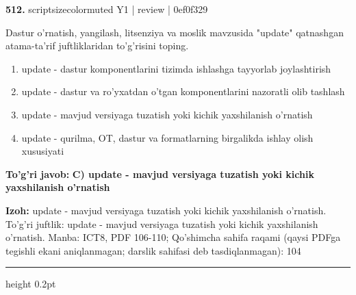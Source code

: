 \documentclass[10pt,a4paper]{article}
\begin{document}
{\bfseries\sffamily\color{ink} 512.} {scriptsizecolor{muted} Y1 | review | 0ef0f329}
\par
Dastur o'rnatish, yangilash, litsenziya va moslik mavzusida "update" qatnashgan atama-ta'rif juftliklaridan to'g'risini toping.
\begin{enumerate}[label=\Alph*),leftmargin=9mm]
\item update - dastur komponentlarini tizimda ishlashga tayyorlab joylashtirish
\item update - dastur va ro'yxatdan o'tgan komponentlarini nazoratli olib tashlash
\item update - mavjud versiyaga tuzatish yoki kichik yaxshilanish o'rnatish
\item update - qurilma, OT, dastur va formatlarning birgalikda ishlay olish xususiyati
\end{enumerate}
\begin{tcolorbox}[enhanced,breakable,colback=teal!4,colframe=teal!60!black,boxrule=0.45pt,arc=1.2mm,left=2.7mm,right=2.7mm,top=1.8mm,bottom=1.8mm,before skip=2mm,after skip=2mm]
{\bfseries\sffamily\color{teal}To'g'ri javob:} \textbf{C) update - mavjud versiyaga tuzatish yoki kichik yaxshilanish o'rnatish}
\par\smallskip
{\bfseries Izoh:} update - mavjud versiyaga tuzatish yoki kichik yaxshilanish o'rnatish. To'g'ri juftlik: update - mavjud versiyaga tuzatish yoki kichik yaxshilanish o'rnatish. Manba: ICT8, PDF 106-110; Qo'shimcha sahifa raqami (qaysi PDFga tegishli ekani aniqlanmagan; darslik sahifasi deb tasdiqlanmagan): 104
\end{tcolorbox}
\vspace{2mm}\hrule height 0.2pt\vspace{3mm}
\end{document}
